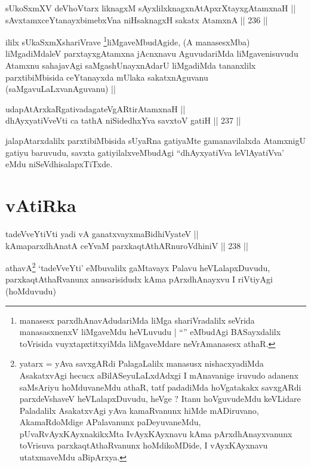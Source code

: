 
\begin{shl}
sUkoSxmXV deVhoV\s tarx liknagxM sAyxlilxknagxnAtApxrXtayxgAtamxnaH || \\
sAvxtamxceYtanayxbimebxVna niHsaknagxH sakatx AtamxnA ||  236 ||  
\end{shl}

\begin{artha}
ililx sUkaSxmXshariVrave \footnote{manasesx parxdhAnavAdudariMda liMga
  shariVradalilx seVrida manasasxnenxV liMgaveMdu heVLuvudu |
  ``\stext'' eMbudAgi BASayxdalilx toVrisida vuyxtapxtitxyiMda
  liMgaveMdare neVrAmanasesx athaR.}liMgaveMbudAgide, (A manasesxMba)
liMgadiMdaleV parxtayxgAtamxna jAcnxnavu AguvudariMda liMgavenisuvudu
Atamxnu sahajavAgi saMgashUnayxnAdarU liMgadiMda tananxlilx
parxtibiMbisida ceYtanayxda mUlaka sakatxnAguvanu
(saMgavuLaLxvanAguvanu) ||
\end{artha}


\begin{shl}
udapAtArxkaRgativadagateVgARtirAtamxnaH || \\
dhAyxyatiVveVti ca tathA niSidedhxYva savxtoV gatiH ||  237 ||  
\end{shl}

\begin{artha}
jalapAtarxdalilx parxtibiMbisida sUyaRna gatiyaMte gamanavilalxda
AtamxnigU gatiyu baruvudu, savxta gatiyilalxveMbudAgi ``dhAyxyatiVva
leVlAyatiVva' eMdu niSeVdhisalapxTiTxde.
\end{artha}

\section*{vAtiRka}


\begin{shl}
tadeVveYtiVti yadi vA ganatxvayxmaBidhiVyateV || \\
kAmaparxdhAnatA ceYvaM parxkaqtAthARnuroVdhiniV ||  238 ||  
\end{shl}

\begin{artha}
athavA\footnote{yatarx = yAva savxgARdi PalagaLalilx manasusx
  nishacxyadiMda AsakatxvAgi hecucx aBilASeyuLaLxdAdxgi I mAnavanige
  iruvudo adanenx saMsAriyu hoMduvaneMdu athaR, tatf padadiMda
  hoVgatakakx savxgARdi parxdeVshaveV heVLalapxDuvudu, heVge ? Itanu
  hoVguvudeMdu keVLidare Paladalilx AsakatxvAgi yAva kamaRvanunx hiMde
  mADiruvano, AkamaRdoMdige APalavanunx paDeyuvaneMdu,
  pUvaRvAyxKAyxnakikxMta IvAyxKAyxnavu kAma pArxdhAnayxvanunx
  toVrisuva parxkaqtAthaRvanunx hoMdikoMDide, I vAyxKAyxnavu
  utatxmaveMdu aBipArxya.} `tadeVveYti' eMbuvalilx gaMtavayx Palavu
heVLalapxDuvudu, parxkaqtAthaRvanunx anusarisidudx kAma pArxdhAnayxvu
I riVtiyAgi (hoMduvudu)
\end{artha}

